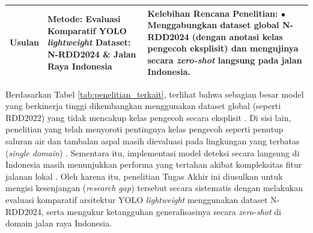 \begin{longtable}{>{\raggedright}p{1.4cm}>{\raggedright}p{3.3cm}>{\raggedright\arraybackslash}p{7.8cm}}
  \hline
  \textbf{Usulan}             & \textbf{Metode:} Evaluasi Komparatif YOLO \textit{lightweight} \newline \textbf{Dataset:} N-RDD2024 \& Jalan Raya Indonesia & \textbf{Kelebihan Rencana Penelitian:} \newline $\bullet$ Menggabungkan dataset global N-RDD2024 (dengan anotasi kelas pengecoh eksplisit) dan mengujinya secara \textit{zero-shot} langsung pada jalan Indonesia.                                                                                                                                                  \\
  \hline
\end{longtable}

Berdasarkan Tabel \ref{tab:penelitian_terkait}, terlihat bahwa sebagian besar model yang berkinerja tinggi dikembangkan menggunakan dataset global (seperti RDD2022) yang tidak mencakup kelas pengecoh secara eksplisit \cite{Li2024, Zeng2024}. Di sisi lain, penelitian yang telah menyoroti pentingnya kelas pengecoh seperti penutup saluran air dan tambalan aspal masih dievaluasi pada lingkungan yang terbatas (\textit{single domain}) \cite{matouq2024ai, Shi_2026}. Sementara itu, implementasi model deteksi secara langsung di Indonesia masih menunjukkan performa yang tertahan akibat kompleksitas fitur jalanan lokal \cite{hugo2025efficientdet}. Oleh karena itu, penelitian Tugas Akhir ini diusulkan untuk mengisi kesenjangan (\textit{research gap}) tersebut secara sistematis dengan melakukan evaluasi komparatif arsitektur YOLO \textit{lightweight} menggunakan dataset N-RDD2024, serta mengukur ketangguhan generalisasinya secara \textit{zero-shot} di domain jalan raya Indonesia.

